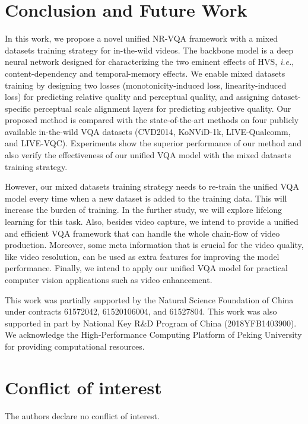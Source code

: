 \documentclass[twocolumn]{svjour3}          \smartqed  \usepackage{graphicx}
\begin{document}
\section{Conclusion and Future Work}
\label{sec:conclusion}
In this work, we propose a novel unified NR-VQA framework with a mixed datasets training strategy for in-the-wild videos. 
The backbone model is a deep neural network designed for characterizing the two eminent effects of HVS, \textit{i.e.}, content-dependency and temporal-memory effects. 
We enable mixed datasets training by designing two losses (monotonicity-induced loss, linearity-induced loss) for predicting relative quality and perceptual quality, and assigning dataset-specific perceptual scale alignment layers for predicting subjective quality.
Our proposed method is compared with the state-of-the-art methods on four publicly available in-the-wild VQA datasets (CVD2014, KoNViD-1k, LIVE-Qualcomm, and LIVE-VQC).
Experiments show the superior performance of our method and also verify the effectiveness of our unified VQA model with the mixed datasets training strategy.

However, our mixed datasets training strategy needs to re-train the unified VQA model every time when a new dataset is added to the training data. 
This will increase the burden of training. 
In the further study, we will explore lifelong learning for this task. 
Also, besides video capture, we intend to provide a unified and efficient VQA framework that can handle the whole chain-flow of video production. 
Moreover, some meta information that is crucial for the video quality, like video resolution, can be used as extra features for improving the model performance.
Finally, we intend to apply our unified VQA model for practical computer vision applications such as video enhancement.



\begin{acknowledgements}
This work was partially supported by the Natural Science Foundation of China under contracts 61572042,  61520106004,  and 61527804. 
This work was also supported in part by National Key R\&D Program of China (2018YFB1403900).
We acknowledge the High-Performance Computing Platform of Peking University for providing computational resources. 
\end{acknowledgements}


\section*{Conflict of interest}
The authors declare no conflict of interest.

         
\end{document}
